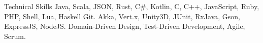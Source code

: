 
\begin{rubric}{Technical Skills}
	Java, Scala, JSON, Rust, C#, Kotlin, C, C++, JavaScript, Ruby, PHP, Shell, Lua, Haskell
	Git.
	Akka, Vert.x, Unity3D, JUnit, RxJava, Gson, ExpressJS, NodeJS.
	Domain-Driven Design, Test-Driven Development, Agile, Scrum.
\end{rubric}
